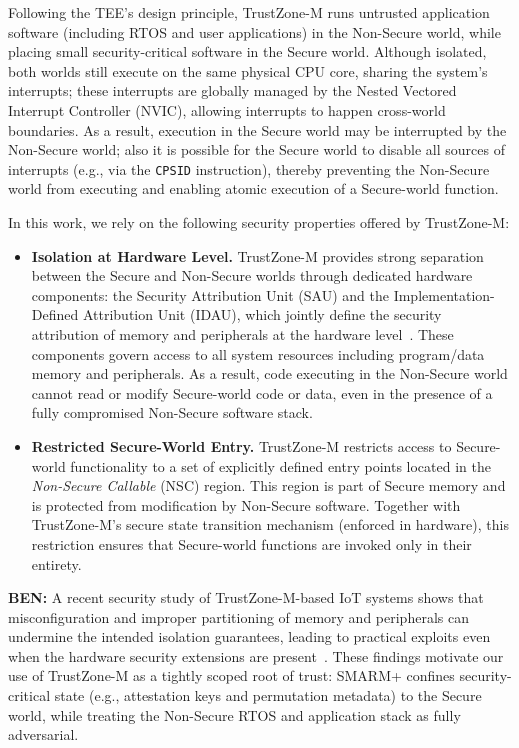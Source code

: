 \documentclass{ieeeaccess}
\DeclareRobustCommand{\ben}[1]{{\color{BENcolor}\textbf{BEN:} #1}}
\newcommand{\rtsmarm}{SMARM+\xspace}
\begin{document}
Following the TEE's design principle, TrustZone-M runs untrusted application software (including RTOS and user applications) in the Non-Secure world, while placing small security-critical software in the Secure world.
Although isolated, both worlds still execute on the same physical CPU core, sharing the system's interrupts;
these interrupts are globally managed by the Nested Vectored Interrupt Controller (NVIC), allowing interrupts to happen cross-world boundaries.
As a result, execution in the Secure world may be interrupted by the Non-Secure world; also it is possible for the Secure world to disable all sources of interrupts (e.g., via the \texttt{CPSID} instruction), thereby preventing the Non-Secure world from executing and enabling atomic execution of a Secure-world function.

In this work, we rely on the following security properties offered by TrustZone-M:

\begin{itemize}
    \item \textbf{Isolation at Hardware Level.}
    TrustZone-M provides strong separation between the Secure and Non-Secure worlds through dedicated hardware components: the Security Attribution Unit (SAU) and the Implementation-Defined Attribution Unit (IDAU), which jointly define the security attribution of memory and peripherals at the hardware level~\cite{arm-trustzone-cm}.
    These components govern access to all system resources including program/data memory and peripherals.
    As a result, code executing in the Non-Secure world cannot read or modify Secure-world code or data, even in the presence of a fully compromised Non-Secure software stack.

    \item \textbf{Restricted Secure-World Entry.}
    TrustZone-M restricts access to Secure-world functionality to a set of explicitly defined entry points located in the \emph{Non-Secure Callable} (NSC) region.
    This region is part of Secure memory and is protected from modification by Non-Secure software.
    Together with TrustZone-M's secure state transition mechanism (enforced in hardware), this restriction ensures that Secure-world functions are invoked only in their entirety.
\end{itemize}


\ben{A recent security study of TrustZone-M-based IoT systems shows that misconfiguration and improper partitioning of memory and peripherals can undermine the intended isolation guarantees, leading to practical exploits even when the hardware security extensions are present~\cite{tzm-sec-iot}.}
These findings motivate our use of TrustZone-M as a tightly scoped root of trust: \rtsmarm confines security-critical state (e.g., attestation keys and permutation
metadata) to the Secure world, while treating the Non-Secure RTOS and application stack as fully adversarial.
\end{document}
